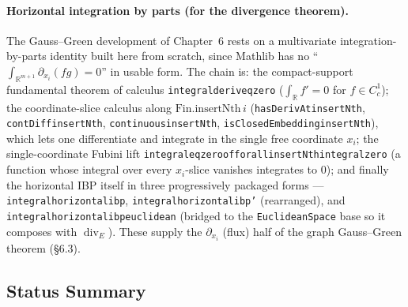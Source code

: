 ﻿\documentclass[12pt, a4paper]{article}
\renewcommand{\_}{\origunderscore\allowbreak}
\theoremstyle{definition}
\theoremstyle{plain}
\begin{document}
\paragraph{Horizontal integration by parts (for the divergence theorem).}
The Gauss--Green development of Chapter~6 rests on a multivariate integration-by-parts identity
built here from scratch, since Mathlib has no ``$\int_{\mathbb{R}^{m+1}}\partial_{x_i}(fg)=0$'' in
usable form. The chain is: the compact-support fundamental theorem of calculus
\texttt{integral\_deriv\_eq\_zero} ($\int_{\mathbb{R}} f' = 0$ for $f\in C^1_c$); the coordinate-slice
calculus along $\mathrm{Fin.insertNth}\,i$ (\texttt{hasDerivAt\_insertNth},
\texttt{contDiff\_insertNth}, \texttt{continuous\_insertNth}, \texttt{isClosedEmbedding\_insertNth}),
which lets one differentiate and integrate in the single free coordinate $x_i$; the single-coordinate
Fubini lift \texttt{integral\_eq\_zero\_of\_forall\_insertNth\_integral\_zero} (a function whose
integral over every $x_i$-slice vanishes integrates to $0$); and finally the horizontal IBP itself in
three progressively packaged forms --- \texttt{integral\_horizontal\_ibp},
\texttt{integral\_horizontal\_ibp'} (rearranged), and \texttt{integral\_horizontal\_ibp\_euclidean}
(bridged to the \texttt{EuclideanSpace} base so it composes with $\operatorname{div}_E$). These
supply the $\partial_{x_i}$ (flux) half of the graph Gauss--Green theorem (\S6.3).

\subsection{Status Summary}
\end{document}
